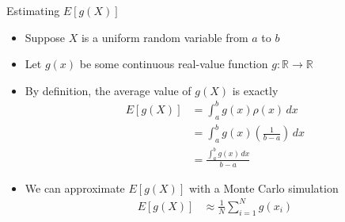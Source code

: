 \documentclass[10pt]{beamer}
\begin{document}
\begin{frame}{Estimating $E[g(X)]$}

\begin{itemize}
    \item Suppose $X$ is a uniform random variable from $a$ to $b$

    \item Let $g(x)$ be some continuous real-value function $g:\mathbb{R}\rightarrow \mathbb{R}$

    \item By definition, the average value of $g(X)$ is exactly
    \begin{align*}
        E[g(X)] & = \int_a^b g(x)\rho(x)\,dx \\  
                & = \int_a^b g(x)  \left(\frac{1}{b-a}\right) \,dx \\  
                & = \frac{\int_a^b g(x)\,dx}{b-a}
    \end{align*}

    \item We can approximate $E[g(X)]$ with a Monte Carlo simulation
    \begin{align*}
        E[g(X)] & \approx \frac{1}{N} \sum_{i=1}^N g(x_i)
    \end{align*}
\end{itemize}
\end{frame}
\end{document}
